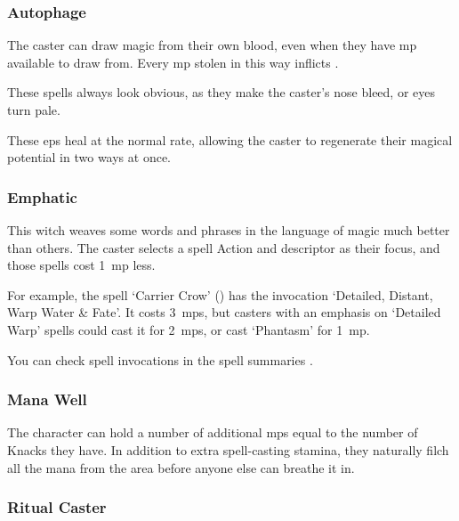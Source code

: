 \begin{multicols}{2}


\subsubsection{Autophage}

The caster can draw magic from their own blood, even when they have \gls{mp} available to draw from.
Every \gls{mp} stolen in this way inflicts .

These spells always look obvious, as they make the caster's nose bleed, or eyes turn pale.

These \glspl{ep} heal at the normal rate, allowing the caster to regenerate their magical potential in two ways at once.

\subsubsection{Emphatic}
\label{emphaticCaster}

This \gls{witch} weaves some words and phrases in the language of magic much better than others.
The caster selects a spell Action and \gls{descriptor} as their focus, and those spells cost 1~\gls{mp} less.

For example, the spell `Carrier Crow' () has the invocation `Detailed, Distant, Warp Water \& Fate'.
It costs 3~\glspl{mp}, but casters with an emphasis on `Detailed Warp' spells could cast it for 2~\glspl{mp}, or cast `Phantasm' for 1~\gls{mp}.

You can check spell \glspl{invocation} in the spell summaries .

\subsubsection{Mana Well}
\label{manaWell}

The character can hold a number of additional \glspl{mp} equal to the number of Knacks they have.
In addition to extra spell-casting stamina, they naturally filch all the mana from the \gls{area} before anyone else can breathe it in.

\subsubsection{Ritual Caster}
\label{ritualCaster}


\end{multicols}
